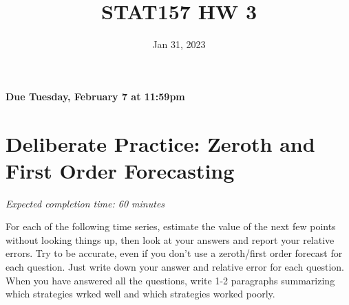 \documentclass[11pt]{article}
\title{STAT157 HW 3}
\date{Jan 31, 2023}
\begin{document}
\maketitle

\hfill \textbf{Due Tuesday, February 7 at 11:59pm}

\section*{Deliberate Practice: Zeroth and First Order Forecasting}

\emph{Expected completion time: 60 minutes}

For each of the following time series, estimate the value of the next few points without looking things up, then look at your answers and report your relative errors. Try to be accurate, even if you don't use a zeroth/first order forecast for each question. Just write down your answer and relative error for each question. When you have answered all the questions, write 1-2 paragraphs summarizing which strategies wrked well and which strategies worked poorly.
\end{document}
